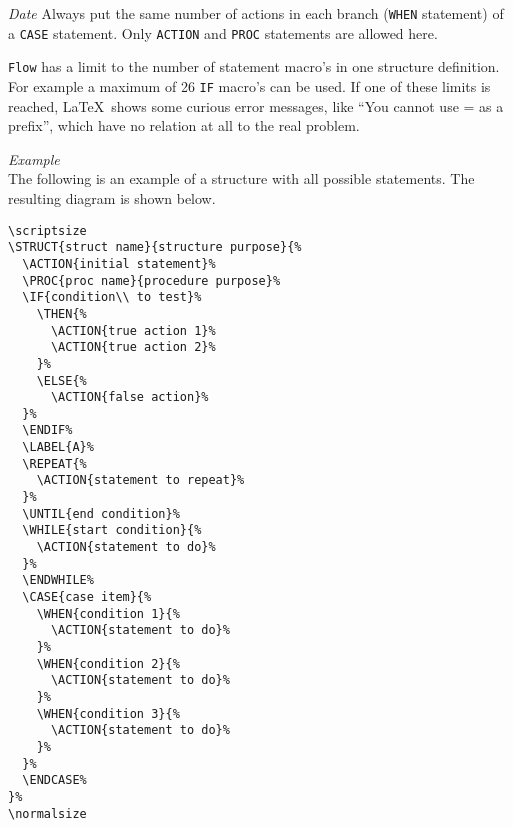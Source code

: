 \begin{namelist}{{\large\it Date}}
Always put the same number
of actions in each branch ({\tt WHEN} statement) of a {\tt CASE}
statement. Only {\tt ACTION} and {\tt PROC} statements are
allowed here.

{\tt Flow} has a limit
to the number of statement macro's in one structure definition.
For example a maximum of 26 {\tt IF} macro's can be used. If one of
these limits is reached, \LaTeX\  shows some curious error
messages, like ``You cannot use = as a prefix'', which have no
relation at all to the real problem.

\item[{\large\it Example}]\mbox{}\\
The following is
an example of a structure with all possible statements. The
resulting diagram is shown below.
\begin{verbatim}
\scriptsize
\STRUCT{struct name}{structure purpose}{%
  \ACTION{initial statement}%
  \PROC{proc name}{procedure purpose}%
  \IF{condition\\ to test}%
    \THEN{%
      \ACTION{true action 1}%
      \ACTION{true action 2}%
    }%
    \ELSE{%
      \ACTION{false action}%
  }%
  \ENDIF%
  \LABEL{A}%
  \REPEAT{%
    \ACTION{statement to repeat}%
  }%
  \UNTIL{end condition}%
  \WHILE{start condition}{%
    \ACTION{statement to do}%
  }%
  \ENDWHILE%
  \CASE{case item}{%
    \WHEN{condition 1}{%
      \ACTION{statement to do}%
    }%
    \WHEN{condition 2}{%
      \ACTION{statement to do}%
    }%
    \WHEN{condition 3}{%
      \ACTION{statement to do}%
    }%
  }%
  \ENDCASE%
}%
\normalsize
\end{verbatim}
\end{namelist}
\pagebreak
\scriptsize
{}%
\normalsize

